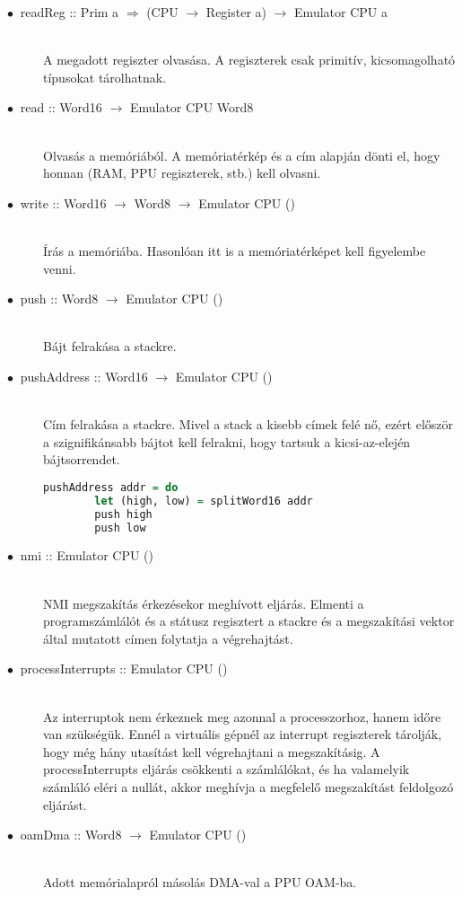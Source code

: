 \begin{description}
	\item[$\bullet\:$ readReg :: Prim a $\Rightarrow$ (CPU $\rightarrow$ Register a) $\rightarrow$ Emulator CPU a] \hfill \\
	A megadott regiszter olvasása. A regiszterek csak primitív, kicsomagolható típusokat tárolhatnak.
	\item[$\bullet\:$ read :: Word16 $\rightarrow$ Emulator CPU Word8] \hfill \\
	Olvasás a memóriából. A memóriatérkép és a cím alapján dönti el, hogy honnan (RAM, PPU regiszterek, stb.) kell olvasni.
	\item[$\bullet\:$ write :: Word16 $\rightarrow$ Word8 $\rightarrow$ Emulator CPU ()] \hfill \\
	Írás a memóriába. Hasonlóan itt is a memóriatérképet kell figyelembe venni.
	\item[$\bullet\:$ push :: Word8 $\rightarrow$ Emulator CPU ()] \hfill \\
	Bájt felrakása a stackre.
	\item[$\bullet\:$ pushAddress :: Word16 $\rightarrow$ Emulator CPU ()] \hfill \\
	Cím felrakása a stackre. Mivel a stack a kisebb címek felé nő, ezért először a szignifikánsabb bájtot kell felrakni, hogy tartsuk a kicsi-az-elején bájtsorrendet.
	\begin{lstlisting}[language=Haskell]
	pushAddress addr = do
		let (high, low) = splitWord16 addr 
		push high
		push low
	\end{lstlisting}
	\item[$\bullet\:$ nmi :: Emulator CPU ()] \hfill \\
	NMI megszakítás érkezésekor meghívott eljárás. Elmenti a programszámlálót és a státusz regisztert a stackre és a megszakítási vektor által mutatott címen folytatja a végrehajtást.
	\item[$\bullet\:$ processInterrupts :: Emulator CPU ()] \hfill \\
	Az interruptok nem érkeznek meg azonnal a processzorhoz, hanem időre van szükségük.
	Ennél a virtuális gépnél az interrupt regiszterek tárolják, hogy még hány utasítást kell végrehajtani a megszakításig. A processInterrupts eljárás csökkenti a számlálókat, és ha valamelyik számláló eléri a nullát, akkor meghívja a megfelelő megszakítást feldolgozó eljárást. 
	\item[$\bullet\:$ oamDma :: Word8 $\rightarrow$ Emulator CPU ()] \hfill \\
	Adott memórialapról másolás DMA-val a PPU OAM-ba.
\end{description}

